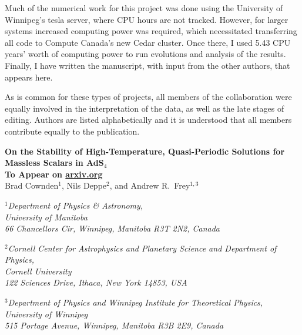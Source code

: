 \documentclass[../PhD.tex]{subfiles}
\begin{document}
Much of the numerical work for this project was done using the University of Winnipeg's tesla server, where CPU hours are not tracked. However, for larger systems increased computing power was required, which necessitated transferring all code to Compute Canada's new Cedar cluster. Once there, I used 5.43 CPU years' worth of computing power to run evolutions and analysis of the results. Finally, I have written the manuscript, with input from the other authors, that appears here.

As is common for these types of projects, all members of the collaboration were equally involved in the interpretation of the data, as well as the late stages of editing. Authors are listed alphabetically and it is understood that all members contribute equally to the publication.

\newpage


\begin{center}
{\bf{\Large On the Stability of High-Temperature, Quasi-Periodic Solutions for Massless Scalars in AdS$_4$}} \\
\bigskip
{\bf To Appear on \href{https://arxiv.org}{arxiv.org}} \\
\bigskip
\bigskip
Brad Cownden$^1$, Nils Deppe$^2$, and Andrew R.~Frey$^{1,3}$\\
\bigskip

$^1${\it Department of Physics \& Astronomy,\\ University of Manitoba\\
66 Chancellors Cir, Winnipeg, Manitoba R3T 2N2, Canada}
\vspace{0.1in}

$^2${\it Cornell Center for Astrophysics and Planetary Science and
Department of Physics,\\ Cornell University\\
122 Sciences Drive, Ithaca, New York 14853, USA}
\vspace{0.1in}

$^3${\it Department of Physics and Winnipeg Institute for Theoretical
Physics,\\ University of Winnipeg\\
515 Portage Avenue, Winnipeg, Manitoba R3B 2E9, Canada }
\end{center}

\bigskip
\end{document}
